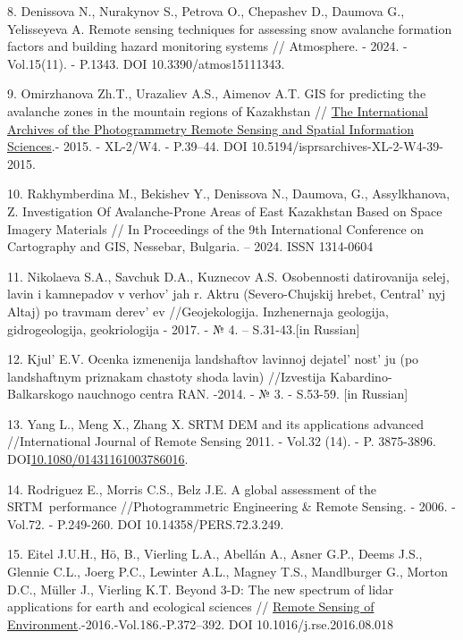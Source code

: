 \begin{references}
8. Denissova N., Nurakynov S., Petrova O., Chepashev D., Daumova G.,
Yelisseyeva A. Remote sensing techniques for assessing snow avalanche
formation factors and building hazard monitoring systems // Atmosphere.
- 2024. - Vol.15(11). - P.1343. DOI 10.3390/atmos15111343.

9. Omirzhanova Zh.T., Urazaliev A.S., Aimenov A.T. GIS for predicting
the avalanche zones in the mountain regions of Kazakhstan //
\href{https://www.researchgate.net/journal/The-International-Archives-of-the-Photogrammetry-Remote-Sensing-and-Spatial-Information-Sciences-2194-9034?_tp=eyJjb250ZXh0Ijp7ImZpcnN0UGFnZSI6InB1YmxpY2F0aW9uIiwicGFnZSI6InB1YmxpY2F0aW9uIn19}{The
International Archives of the Photogrammetry Remote Sensing and Spatial
Information Sciences}.- 2015. - XL-2/W4. - P.39--44. DOI
10.5194/isprsarchives-XL-2-W4-39-2015.

10. Rakhymberdina M., Bekishev Y., Denissova N., Daumova, G.,
Assylkhanova, Z. Investigation Of Avalanche-Prone Areas of East
Kazakhstan Based on Space Imagery Materials // In Proceedings of the 9th
International Conference on Cartography and GIS, Nessebar, Bulgaria. --
2024. ISSN 1314-0604

11. Nikolaeva S.A., Savchuk D.A., Kuznecov A.S. Osobennosti datirovanija
selej, lavin i kamnepadov v verhov' jah r. Aktru
(Severo-Chujskij hrebet, Central' nyj Altaj) po travmam
derev' ev //Geojekologija. Inzhenernaja geologija,
gidrogeologija, geokriologija - 2017. - № 4. -- S.31-43.{[}in
Russian{]}

12. Kjul'{} E.V. Ocenka izmenenija landshaftov lavinnoj
dejatel' nost' ju (po landshaftnym
priznakam chastoty shoda lavin) //Izvestija Kabardino-Balkarskogo
nauchnogo centra RAN. -2014. - № 3. - S.53-59. {[}in Russian{]}

13. Yang L., Meng X., Zhang X. SRTM DEM and its applications advanced
//International Journal of Remote Sensing 2011. - Vol.32 (14). - P.
3875-3896.
DOI\href{http://dx.doi.org/10.1080/01431161003786016}{10.1080/01431161003786016}.

14. Rodriguez E., Morris C.S., Belz J.E. A global assessment of the
SRTM~performance //Photogrammetric Engineering \& Remote Sensing. -
2006. -Vol.72. - P.249-260. DOI 10.14358/PERS.72.3.249.

15. Eitel J.U.H., Hö, B., Vierling L.A., Abellán A., Asner G.P., Deems
J.S., Glennie C.L., Joerg P.C., Lewinter A.L., Magney T.S., Mandlburger
G., Morton D.C., Müller J., Vierling K.T. Beyond 3-D: The new spectrum
of lidar applications for earth and ecological sciences //
\href{https://asu.elsevierpure.com/en/publications/beyond-3-d-the-new-spectrum-of-lidar-applications-for-earth-and-e}{\hfill\break
Remote Sensing of Environment}.-2016.-Vol.186.-P.372--392. DOI
10.1016/j.rse.2016.08.018


\end{references}
